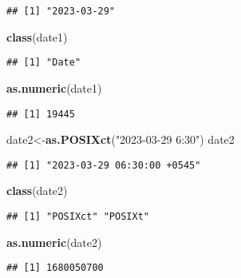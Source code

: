 \documentclass[
]{article}
\newenvironment{Shaded}{\begin{snugshade}}{\end{snugshade}}
\newcommand{\FunctionTok}[1]{\textcolor[rgb]{0.13,0.29,0.53}{\textbf{#1}}}
\newcommand{\NormalTok}[1]{#1}
\newcommand{\OtherTok}[1]{\textcolor[rgb]{0.56,0.35,0.01}{#1}}
\newcommand{\StringTok}[1]{\textcolor[rgb]{0.31,0.60,0.02}{#1}}
\begin{document}
\begin{verbatim}
## [1] "2023-03-29"
\end{verbatim}

\begin{Shaded}
\begin{Highlighting}[]
\FunctionTok{class}\NormalTok{(date1)}
\end{Highlighting}
\end{Shaded}

\begin{verbatim}
## [1] "Date"
\end{verbatim}

\begin{Shaded}
\begin{Highlighting}[]
\FunctionTok{as.numeric}\NormalTok{(date1)}
\end{Highlighting}
\end{Shaded}

\begin{verbatim}
## [1] 19445
\end{verbatim}

\begin{Shaded}
\begin{Highlighting}[]
\NormalTok{date2}\OtherTok{\textless{}{-}}\FunctionTok{as.POSIXct}\NormalTok{(}\StringTok{"2023{-}03{-}29 6:30"}\NormalTok{)}
\NormalTok{date2}
\end{Highlighting}
\end{Shaded}

\begin{verbatim}
## [1] "2023-03-29 06:30:00 +0545"
\end{verbatim}

\begin{Shaded}
\begin{Highlighting}[]
\FunctionTok{class}\NormalTok{(date2)}
\end{Highlighting}
\end{Shaded}

\begin{verbatim}
## [1] "POSIXct" "POSIXt"
\end{verbatim}

\begin{Shaded}
\begin{Highlighting}[]
\FunctionTok{as.numeric}\NormalTok{(date2)}
\end{Highlighting}
\end{Shaded}

\begin{verbatim}
## [1] 1680050700
\end{verbatim}
\end{document}
